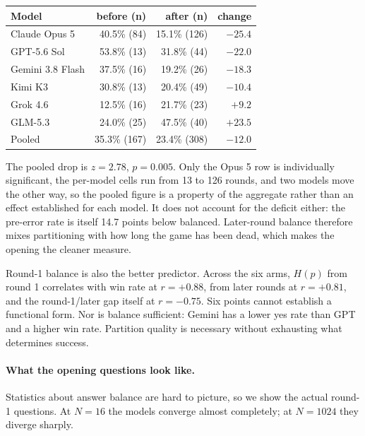 \documentclass[11pt]{article}
\begin{document}
\begin{center}\small
\begin{tabular}{lrrr}
\toprule
Model & before (n) & after (n) & change \\
\midrule
Claude Opus 5    & 40.5\% (84) & 15.1\% (126) & $-25.4$ \\
GPT-5.6 Sol      & 53.8\% (13) & 31.8\% (44)  & $-22.0$ \\
Gemini 3.8 Flash & 37.5\% (16) & 19.2\% (26)  & $-18.3$ \\
Kimi K3          & 30.8\% (13) & 20.4\% (49)  & $-10.4$ \\
Grok 4.6         & 12.5\% (16) & 21.7\% (23)  & $+9.2$ \\
GLM-5.3          & 24.0\% (25) & 47.5\% (40)  & $+23.5$ \\
\midrule
Pooled           & 35.3\% (167) & 23.4\% (308) & $-12.0$ \\
\bottomrule
\end{tabular}
\end{center}

The pooled drop is $z=2.78$, $p=0.005$. Only the Opus 5 row is individually
significant, the per-model cells run from 13 to 126 rounds, and two models move
the other way, so the pooled figure is a property of the aggregate rather than
an effect established for each model. It does not account for the deficit
either: the pre-error rate is itself 14.7 points below balanced. Later-round
balance therefore mixes partitioning with how long the game has been dead, which
makes the opening the cleaner measure.

Round-1 balance is also the better predictor. Across the six arms, $H(p)$ from
round 1 correlates with win rate at $r=+0.88$, from later rounds at $r=+0.81$,
and the round-1/later gap itself at $r=-0.75$. Six points cannot
establish a functional form. Nor is balance sufficient: Gemini has a lower yes
rate than GPT and a higher win rate. Partition quality is necessary without
exhausting what determines success.

\paragraph{What the opening questions look like.} Statistics about answer
balance are hard to picture, so we show the actual round-1 questions. At
$N{=}16$ the models converge almost completely; at $N{=}1024$ they diverge
sharply.
\end{document}
